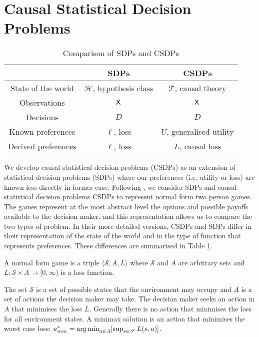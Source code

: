 \section{Causal Statistical Decision Problems}
\begin{table}[ht]
    \centering
\begin{tabular}{ |c|c|c| } 
 \hline
  & SDPs & CSDPs \\ 
 \hline
 State of the world & $\mathscr{H}$, hypothesis class & $\mathscr{T}$, causal theory \\ 
 Observations & $\mathsf{X}$ & $\mathsf{X}$ \\ 
 Decisions & $D$ & $D$ \\
 Known preferences & $\ell$, loss & $U$, generalised utility \\
 Derived preferences & $\ell$, loss & $L$, causal loss\\
 \hline
\end{tabular}
    \caption{Comparison of SDPs and CSDPs}
    \label{tab:sdp_cdp_comparison}
\end{table}

We develop causal statistical decision problems (CSDPs) as an extension of statistical decision problems (SDPs) where our preferences (i.e. utility or loss) are known less directly in former case. Following \citep{toutenburg_ferguson_1967}, we consider SDPs and causal statistical decision problems CSDPs to represent normal form two person games. The games represent at the most abstract level the options and possible payoffs available to the decision maker, and this representation allows us to compare the two types of problem. In their more detailed versions,  CSDPs and SDPs differ in their representation of the state of the world and in the type of function that represents preferences. These differences are summarised in Table \ref{tab:sdp_cdp_comparison}.

\begin{definition}
A normal form game is a triple $\langle \mathscr{S}, A, L\rangle$ where $\mathscr{S}$ and $A$ are arbitrary sets and $L:\mathscr{S}\times A\to [0,\infty)$ is a loss function.

\end{definition}
The set $\mathscr{S}$ is a set of possible states that the environment may occupy and $A$ is a set of actions the decision maker may take. The decision maker seeks an action in $A$ that minimises the loss $L$. Generally there is no action that minimises the loss for all environment states. A minimax solution is an action that minimises the worst case loss: $a^*_{mm} = \operatorname*{arg\,min}_{a\in A} [\sup_{s\in \mathscr{S}} L(s,a)]$.

